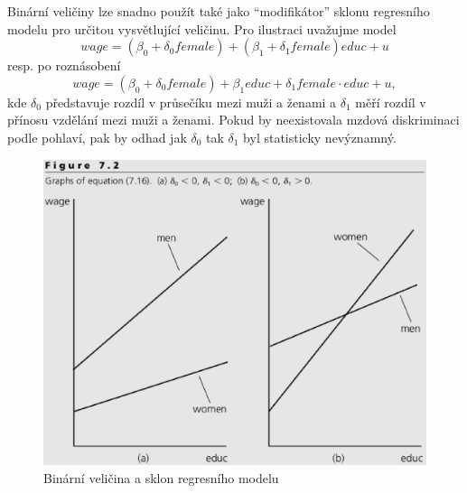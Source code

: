 Binární veličiny lze snadno použít také jako ``modifikátor'' 
sklonu regresního modelu pro určitou vysvětlující veličinu. Pro 
ilustraci uvažujme model
\begin{equation}
wage = (\beta_0 + \delta_0 female) + (\beta_1 + \delta_1 female)educ + 
u
\end{equation}
resp. po roznásobení
\begin{equation}
wage = (\beta_0 + \delta_0 female) + \beta_1 educ + \delta_1 female \cdot educ + 
u,
\end{equation}
kde $\delta_0$ představuje rozdíl v průsečíku mezi muži a ženami 
a $\delta_1$ měří rozdíl v přínosu vzdělání mezi muži a 
ženami. Pokud by neexistovala mzdová diskriminaci podle pohlaví, pak 
by odhad jak $\delta_0$ tak $\delta_1$ byl statisticky 
nevýznamný.

\begin{figure}[htp]
\centering
\includegraphics[scale = 0.5]{pictures/figure_7_2.eps}
\caption{Binární veličina a sklon regresního modelu}
\label{figure_7_2}
\end{figure} 

